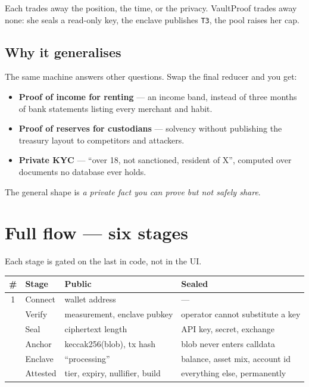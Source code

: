 \documentclass[11pt,a4paper]{article}
\newcommand{\code}[1]{\texttt{\small #1}}
\newcommand{\ProjectName}{VaultProof}
\begin{document}
\vspace{0.8em}
Each trades away the position, the time, or the privacy. \ProjectName{} trades
away none: she seals a read-only key, the enclave publishes \code{T3}, the pool
raises her cap.

\subsection{Why it generalises}

The same machine answers other questions. Swap the final reducer and you get:

\begin{itemize}[leftmargin=1.2em, itemsep=0.35em]
  \item \textbf{Proof of income for renting} --- an income band, instead of
        three months of bank statements listing every merchant and habit.
  \item \textbf{Proof of reserves for custodians} --- solvency without
        publishing the treasury layout to competitors and attackers.
  \item \textbf{Private KYC} --- ``over 18, not sanctioned, resident of X'',
        computed over documents no database ever holds.
\end{itemize}

The general shape is \emph{a private fact you can prove but not safely share}.

\section{Full flow --- six stages}

Each stage is gated on the last in code, not in the UI.

\begin{tabularx}{\textwidth}{@{}c l L L@{}}
  \toprule
  \textbf{\#} & \textbf{Stage} & \textbf{Public} & \textbf{Sealed} \\
   & Connect   & wallet address              & --- \\
   & Verify    & measurement, enclave pubkey & operator cannot substitute a key \\
   & Seal      & ciphertext length           & API key, secret, exchange \\
   & Anchor    & keccak256(blob), tx hash    & blob never enters calldata \\
   & Enclave   & ``processing''              & balance, asset mix, account id \\
   & Attested  & tier, expiry, nullifier, build & everything else, permanently \\
  \bottomrule
\end{tabularx}
\end{document}

